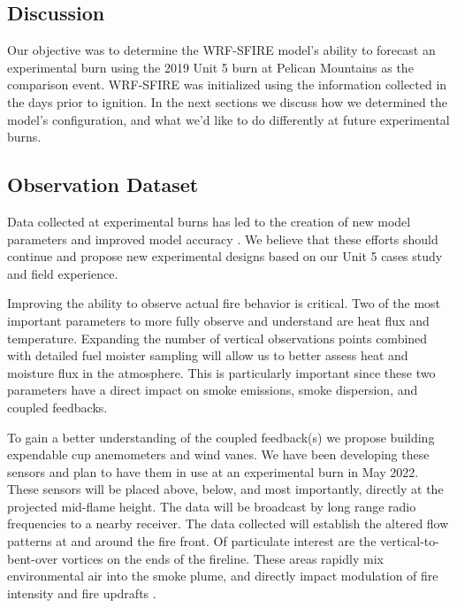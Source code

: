 \documentclass[preprints,article,accept,moreauthors,pdftex]{Definitions/mdpi}
\begin{document}
\subsection{Discussion}

Our objective was to determine the WRF-SFIRE model’s ability to forecast an experimental burn using the 2019 Unit 5 burn at Pelican Mountains as the comparison event. WRF-SFIRE was initialized using the information collected in the days prior to ignition. In the next sections we discuss how we determined the model’s configuration, and what we’d like to do differently at future experimental burns.

\subsection{Observation Dataset}

Data collected at experimental burns has led to the creation of new model parameters and improved model accuracy \cite{kochanski_experimental_2018,mallia_incorporating_2020,moisseeva_capturing_2019,kochanski_evaluation_2013,coen_requirements_2018}. We believe that these efforts should continue and propose new experimental designs based on our Unit 5 cases study and field experience.

Improving the ability to observe actual fire behavior is critical. Two of the most important parameters to more fully observe and understand are heat flux and temperature. Expanding the number of vertical observations points combined with detailed fuel moister sampling will allow us to better assess heat and moisture flux in the atmosphere. This is particularly important since these two parameters have a direct impact on smoke emissions, smoke dispersion, and coupled feedbacks.

To gain a better understanding of the coupled feedback(s) we propose building expendable cup anemometers and wind vanes. We have been developing these sensors and plan to have them in use at an experimental burn in May 2022. These sensors will be placed above, below, and most importantly, directly at the projected mid-flame height. The data will be broadcast by long range radio frequencies to a nearby receiver. The data collected will establish the altered flow patterns at and around the fire front. Of particulate interest are the vertical-to-bent-over vortices on the ends of the fireline. These areas rapidly mix environmental air into the smoke plume, and directly impact modulation of fire intensity and fire updrafts \cite{moisseeva_wildfire_2021,clements_fire_2016}.
\end{document}
